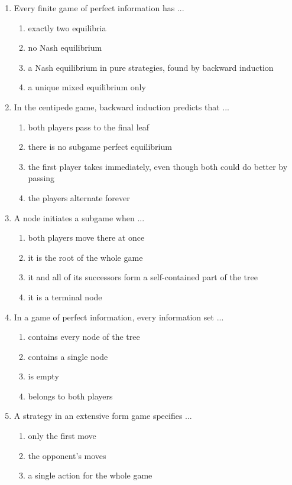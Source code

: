 \documentclass[11pt]{article}
\begin{document}
\begin{enumerate}[itemsep=6pt]
\begin{enumerate}
  \end{enumerate}
  \item Every finite game of perfect information has ...
  \begin{enumerate}
    \item exactly two equilibria
    \item no Nash equilibrium
    \item a Nash equilibrium in pure strategies, found by backward induction
    \item a unique mixed equilibrium only
  \end{enumerate}
  \item In the centipede game, backward induction predicts that ...
  \begin{enumerate}
    \item both players pass to the final leaf
    \item there is no subgame perfect equilibrium
    \item the first player takes immediately, even though both could do better by passing
    \item the players alternate forever
  \end{enumerate}
  \item A node initiates a subgame when ...
  \begin{enumerate}
    \item both players move there at once
    \item it is the root of the whole game
    \item it and all of its successors form a self-contained part of the tree
    \item it is a terminal node
  \end{enumerate}
  \item In a game of perfect information, every information set ...
  \begin{enumerate}
    \item contains every node of the tree
    \item contains a single node
    \item is empty
    \item belongs to both players
  \end{enumerate}
  \item A strategy in an extensive form game specifies ...
  \begin{enumerate}
    \item only the first move
    \item the opponent's moves
    \item a single action for the whole game

\end{enumerate}
\end{enumerate}
\end{document}
